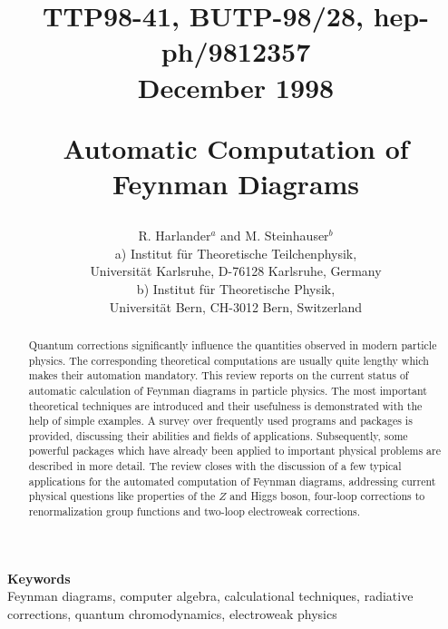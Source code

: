 
\title{
  \vspace{1em}
  \begin{flushright}
    {\bf\normalsize
    TTP98-41, BUTP-98/28, hep-ph/9812357}\\[-.5em]
    {\bf\normalsize December 1998}\\[1em]
  \end{flushright}
  \Large \sc
  Automatic Computation of Feynman Diagrams
  }

\author{{\sc R. Harlander}$^a$ and {\sc M. Steinhauser}$^b$
  \\[3em]
   a) Institut f\"ur Theoretische Teilchenphysik,\\
      Universit\"at Karlsruhe, D-76128 Karlsruhe, Germany
  \\[.5em]
   b) Institut f\"ur Theoretische Physik, \\ Universit\"at
      Bern, CH-3012 Bern, Switzerland
}

\date{}
\maketitle

\begin{abstract} 
  \noindent
  Quantum corrections significantly influence the quantities observed in
  modern particle physics. The corresponding theoretical computations
  are usually quite lengthy which makes their automation mandatory.
  This review reports on the current status of automatic calculation
  of Feynman diagrams in particle physics.  The most important
  theoretical techniques are introduced and their usefulness is
  demonstrated with the help of simple examples. A survey over
  frequently used programs and packages is provided, discussing their
  abilities and fields of applications.  Subsequently, some powerful
  packages which have already been applied to important physical
  problems are described in more detail. The review closes with the
  discussion of a few typical applications for the automated computation
  of Feynman diagrams, addressing current physical questions like
  properties of the $Z$ and Higgs boson, four-loop corrections to
  renormalization group functions and two-loop electroweak corrections.
\end{abstract}

\begin{center}
  {\bf\small Keywords}\\
  {\small Feynman diagrams, computer algebra, calculational techniques,
  radiative corrections, quantum chromodynamics, electroweak physics}
\end{center}
